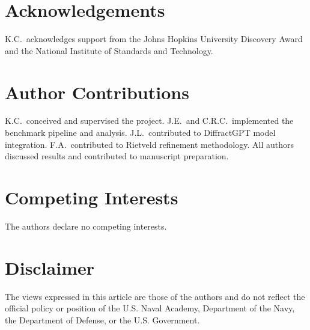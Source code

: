 \documentclass[pdflatex,sn-mathphys-num]{sn-jnl}
\theoremstyle{thmstyleone}
\theoremstyle{thmstyletwo}
\theoremstyle{thmstylethree}
\begin{document}
\section*{Acknowledgements}

K.C.\ acknowledges support from the Johns Hopkins University Discovery Award and the National Institute of Standards and Technology.

\section*{Author Contributions}

K.C.\ conceived and supervised the project. J.E.\ and C.R.C.\ implemented the benchmark pipeline and analysis. J.L.\ contributed to DiffractGPT model integration. F.A.\ contributed to Rietveld refinement methodology. All authors discussed results and contributed to manuscript preparation.

\section*{Competing Interests}

The authors declare no competing interests.

\section*{Disclaimer}

The views expressed in this article are those of the authors and do not reflect the official policy or position of the U.S. Naval Academy, Department of the Navy, the Department of Defense, or the U.S. Government.





\end{document}
